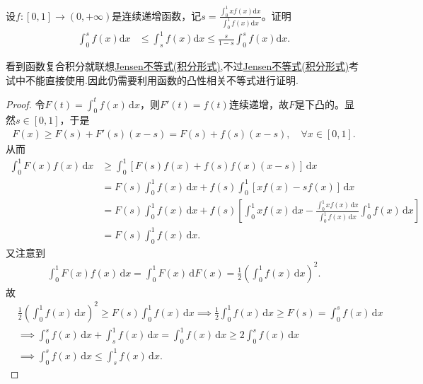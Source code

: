 \documentclass[../../main.tex]{subfiles}
\begin{document}
\begin{example}
设$f:[0,1]\to(0,+\infty)$是连续递增函数，记$s = \frac{\int_{0}^{1}xf(x)\mathrm{d}x}{\int_{0}^{1}f(x)\mathrm{d}x}$。证明
\begin{align*}
\int_{0}^{s}f(x)\mathrm{d}x&\leqslant\int_{s}^{1}f(x)\mathrm{d}x\leqslant\frac{s}{1 - s}\int_{0}^{s}f(x)\mathrm{d}x.
\end{align*}
\end{example}
\begin{note}
看到函数复合积分就联想\hyperref[theorem:Jensen不等式积分形式]{Jensen不等式(积分形式)},不过\hyperref[theorem:Jensen不等式积分形式]{Jensen不等式(积分形式)}考试中不能直接使用.因此仍需要利用函数的凸性相关不等式进行证明.
\end{note}
\begin{proof}
令$F(t) = \int_0^t f(x) \, \mathrm{d}x$，则$F'(t) = f(t)$连续递增，故$F$是下凸的。显然$s \in [0,1]$，于是
\begin{align*}
F(x) \geqslant  F(s) + F'(s)(x - s) = F(s) + f(s)(x - s), \quad \forall x \in [0,1].
\end{align*}
从而
\begin{align*}
\int_0^1 F(x) f(x) \, \mathrm{d}x &\geqslant  \int_0^1 \left[ F(s) f(x) + f(s) f(x)(x - s) \right] \, \mathrm{d}x \\
&= F(s) \int_0^1 f(x) \, \mathrm{d}x + f(s) \int_0^1 \left[ x f(x) - s f(x) \right] \, \mathrm{d}x \\
&= F(s) \int_0^1 f(x) \, \mathrm{d}x + f(s) \left[ \int_0^1 x f(x) \, \mathrm{d}x - \frac{\int_0^1 x f(x) \, \mathrm{d}x}{\int_0^1 f(x) \, \mathrm{d}x} \int_0^1 f(x) \, \mathrm{d}x \right] \\
&= F(s) \int_0^1 f(x) \, \mathrm{d}x.
\end{align*}
又注意到
\begin{align*}
\int_0^1 F(x) f(x) \, \mathrm{d}x = \int_0^1 F(x) \, \mathrm{d}F(x) = \frac{1}{2} \left( \int_0^1 f(x) \, \mathrm{d}x \right)^2.
\end{align*}
故
\begin{align*}
&\frac{1}{2} \left( \int_0^1 f(x) \, \mathrm{d}x \right)^2 \geqslant  F(s) \int_0^1 f(x) \, \mathrm{d}x \implies \frac{1}{2} \int_0^1 f(x) \, \mathrm{d}x \geqslant  F(s) = \int_0^s f(x) \, \mathrm{d}x \\
&\implies \int_0^s f(x) \, \mathrm{d}x + \int_s^1 f(x) \, \mathrm{d}x = \int_0^1 f(x) \, \mathrm{d}x \geqslant  2 \int_0^s f(x) \, \mathrm{d}x \\
&\implies \int_0^s f(x) \, \mathrm{d}x \leqslant  \int_s^1 f(x) \, \mathrm{d}x.

\end{align*}
\end{proof}
\end{document}
